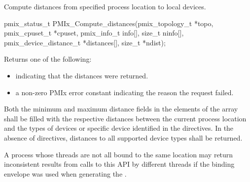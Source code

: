 \summary

Compute distances from specified process location to local devices.

\format

\cspecificstart
\begin{codepar}
pmix_status_t
PMIx_Compute_distances(pmix_topology_t *topo,
                       pmix_cpuset_t *cpuset,
                       pmix_info_t info[], size_t ninfo[],
                       pmix_device_distance_t *distances[],
                       size_t *ndist);
\end{codepar}
\cspecificend

\begin{arglist}
\end{arglist}

Returns one of the following:

\begin{itemize}
\item {} indicating that the distances were returned.
\item a non-zero \ac{PMIx} error constant indicating the reason the request failed.
\end{itemize}


\descr

Both the minimum and maximum distance fields in the elements of the array shall be filled with the respective distances between the current process location and the types of devices or specific device identified in the  directives. In the absence of directives, distances to all supported device types shall be returned.

\adviceuserstart
A process whose threads are not all bound to the same location may return inconsistent results from calls to this \ac{API} by different threads if the  binding envelope was used when generating the .
\adviceuserend

